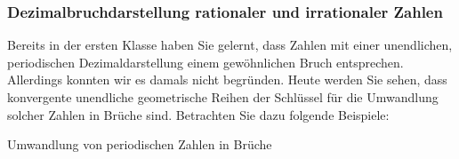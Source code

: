 \subsubsection{Dezimalbruchdarstellung rationaler und irrationaler Zahlen}
Bereits in der ersten Klasse haben Sie gelernt, dass Zahlen mit einer unendlichen, periodischen Dezimaldarstellung einem gewöhnlichen Bruch entsprechen. Allerdings konnten wir es damals nicht begründen. Heute werden Sie sehen, dass konvergente unendliche geometrische Reihen der Schlüssel für die Umwandlung solcher Zahlen in Brüche sind. Betrachten Sie dazu folgende Beispiele:
\begin{bsp}{Umwandlung von periodischen Zahlen in Brüche}{}
    \vspace*{15cm}

\end{bsp}

